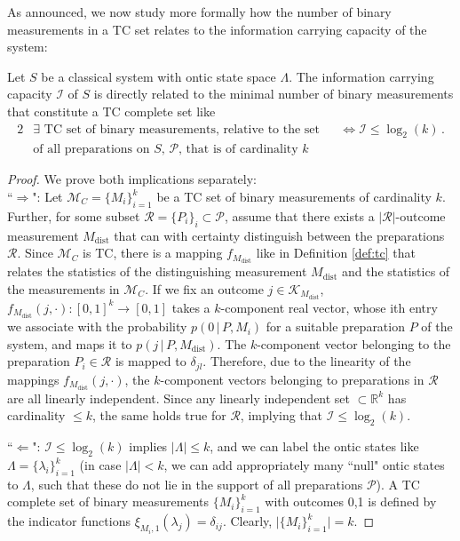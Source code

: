 As announced, we now study more formally how the number of binary measurements in a TC set relates to the information carrying capacity of the system:

\begin{lemma}
\label{lem:infcarcap}
Let $S$ be a classical system with ontic state space $\Lambda$. The information carrying capacity $\mathcal{I}$ of $S$ is directly related to the minimal number of binary measurements that constitute a TC complete set like
\begin{alignat*}{2}
& \exists \text{ TC set of binary measurements, relative to the set} && \iff \mathcal{I}\leq \log_2(k)\,.\\
& \text{of all preparations on $S$, $\mathcal{P}$, that is of cardinality $k$} && 
\end{alignat*}

\end{lemma}
\begin{proof}We prove both implications separately:\\[1em]
``$\Longrightarrow$": 
Let $\mathcal{M}_C=\{M_i\}_{i=1}^k$ be a TC set of binary measurements of cardinality $k$. Further, for some subset $\mathcal{R}=\{P_i\}_i\subset\mathcal{P}$, assume that there exists a $\vert\mathcal{R}\vert$-outcome measurement $M_{\text{dist}}$ that can with certainty distinguish between the preparations $\mathcal{R}$. Since $\mathcal{M}_C$ is TC, there is a mapping $f_{M_{\text{dist}}}$ like in Definition \ref{def:tc} that relates the statistics of the distinguishing measurement $M_{\text{dist}}$ and the statistics of the measurements in $\mathcal{M}_C$. If we fix an outcome $j\in\mathcal{K}_{M_{\text{dist}}}$, ${f_{M_{\text{dist}}}(j,\cdot):[0,1]^{k}\rightarrow[0,1]}$ takes a $k$-component real vector, whose ith entry we associate with the probability $p(0\,\vert\,P,M_i)$ for a suitable preparation $P$ of the system, and maps it to $p(j\,\vert\,P,M_{\text{dist}})$. The $k$-component vector belonging to the preparation $P_i\in\mathcal{R}$ is mapped to $\delta_{jl}$. Therefore, due to the linearity of the mappings $f_{M_{\text{dist}}}(j,\cdot)$, the $k$-component vectors belonging to preparations in $\mathcal{R}$ are all linearly independent. Since any linearly independent set $\subset \mathbb{R}^k$ has cardinality $\leq k$, the same holds true for $\mathcal{R}$, implying that $\mathcal{I}\leq\log_2(k)$.

``$\Longleftarrow$": $\mathcal{I}\leq\log_2(k)$ implies $\vert\Lambda\vert\leq k$, and we can label the ontic states like $\Lambda=\{\lambda_i\}_{i=1}^k$ (in case $\vert\Lambda\vert<k$, we can add appropriately many ``null" ontic states to $\Lambda$, such that these do not lie in the support of all preparations $\mathcal{P}$). A TC complete set of binary measurements $\{M_i\}_{i=1}^k$ with outcomes 0,1 is defined by the indicator functions
$\xi_{M_i,1}(\lambda_j)=\delta_{ij}$. Clearly, $\vert \{M_i\}_{i=1}^k \vert=k$.
\end{proof}

